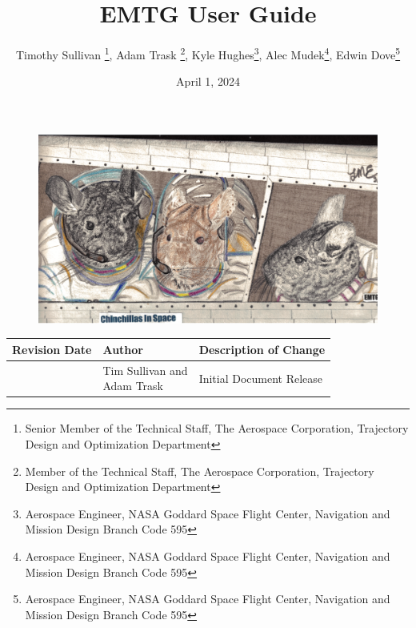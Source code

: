 \documentclass[11pt]{report}
\title{{\Huge EMTG User Guide}}
\author
{	 
	Timothy Sullivan \thanks{Senior Member of the Technical Staff, The Aerospace Corporation, Trajectory Design and Optimization Department},
	Adam Trask \thanks{Member of the Technical Staff, The Aerospace Corporation, Trajectory Design and Optimization Department}, 
	Kyle Hughes\thanks{Aerospace Engineer, NASA Goddard Space Flight Center, Navigation and Mission Design Branch Code 595}, 
	Alec Mudek\thanks{Aerospace Engineer, NASA Goddard Space Flight Center, Navigation and Mission Design Branch Code 595},
	Edwin Dove\thanks{Aerospace Engineer, NASA Goddard Space Flight Center, Navigation and Mission Design Branch Code 595}
}
\date{}
\begin{document}
\begin{titlepage}
\maketitle


\begin{figure}[H]
	\centering
	\includegraphics[width=0.75\linewidth]{../../shared_latex_inputs/images/splashchilla.PNG}
\end{figure}

\begin{table}[H]
	\centering
	\begin{tabular}{|l|l|l|}
		\hline
		\textbf{Revision Date} & \textbf{Author} & \textbf{Description of Change} \\ \hline
		\date{April 1, 2024} & \makecell{Tim Sullivan and \\ Adam Trask} & Initial Document Release \\
		\hline
	\end{tabular}
\end{table}
\end{titlepage}


\tableofcontents
\clearpage
\listoffigures
\clearpage
\listoftables
\clearpage
\listofemtgknownissue
\clearpage

\clearpage

\setcounter{page}{1}













	
\end{document}
